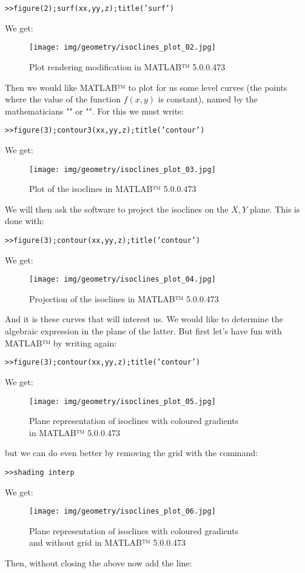 {	\texttt{>>figure(2);surf(xx,yy,z);title('surf')}
	
	We get:
	\begin{figure}[H]
		\centering
		\texttt{[image: img/geometry/isoclines\_plot\_02.jpg]}
		\caption[]{Plot rendering modification in MATLAB™ 5.0.0.473}
	\end{figure}
	
	Then we would like MATLAB™  to plot for us some level curves (the points where the value of the function $f (x, y)$ is constant), named by the mathematicians "" or "". For this we must write:
	
	\texttt{>>figure(3);contour3(xx,yy,z);title('contour')}
	
	We get:
	\begin{figure}[H]
		\centering
		\texttt{[image: img/geometry/isoclines\_plot\_03.jpg]}
		\caption{Plot of the isoclines in MATLAB™ 5.0.0.473}
	\end{figure}
	We will then ask the software to project the isoclines on the $X, Y$ plane. This is done with:
	
	\texttt{>>figure(3);contour(xx,yy,z);title('contour')}
	
	We get:
	\begin{figure}[H]
		\centering
		\texttt{[image: img/geometry/isoclines\_plot\_04.jpg]}
		\caption{Projection of the isoclines in MATLAB™ 5.0.0.473}
	\end{figure}
	And it is these curves that will interest us. We would like to determine the algebraic expression in the plane of the latter. But first let's have fun with MATLAB™  by writing again:
	
	\texttt{>>figure(3);contour(xx,yy,z);title('contour')}
	
	We get:
	\begin{figure}[H]
		\centering
		\texttt{[image: img/geometry/isoclines\_plot\_05.jpg]}
		\caption{Plane representation of isoclines with coloured gradients \\in MATLAB™ 5.0.0.473}
	\end{figure}
	
	but we can do even better by removing the grid with the command:
	
	\texttt{>>shading interp}
	
	We get:
	\begin{figure}[H]
		\centering
		\texttt{[image: img/geometry/isoclines\_plot\_06.jpg]}
		\caption[]{Plane representation of isoclines with coloured gradients \\and without grid in MATLAB™ 5.0.0.473}
	\end{figure}
	Then, without closing the above now add the line:
	
}
